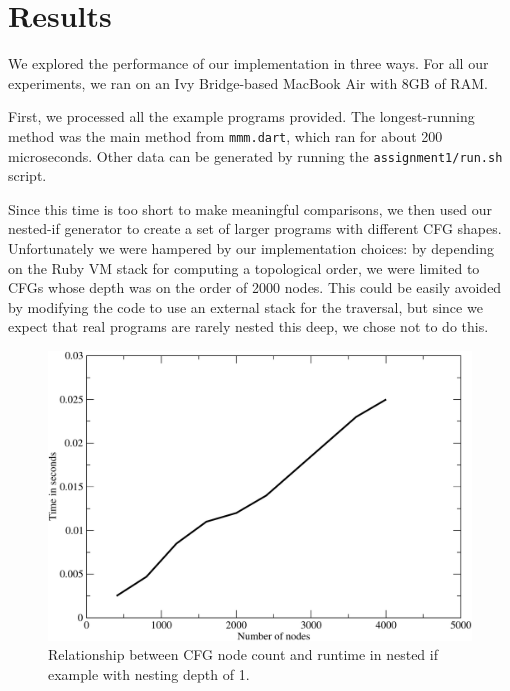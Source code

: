 \documentclass[10pt,twocolumn]{article}
\begin{document}
\section{Results}

We explored the performance of our implementation in three ways. For
all our experiments, we ran on an Ivy Bridge-based MacBook Air with
8GB of RAM.

First, we processed all the example programs provided. The
longest-running method was the main method from \texttt{mmm.dart},
which ran for about 200 microseconds. Other data can be generated by
running the \texttt{assignment1/run.sh} script.

Since this time is too short to make meaningful comparisons, we then
used our nested-if generator to create a set of larger programs with
different CFG shapes. Unfortunately we were hampered by our
implementation choices: by depending on the Ruby VM stack for
computing a topological order, we were limited to CFGs whose depth was
on the order of 2000 nodes. This could be easily avoided by modifying
the code to use an external stack for the traversal, but since we
expect that real programs are rarely nested this deep, we chose not to
do this.


\begin{figure}
\begin{center}
  \includegraphics[width=0.95\columnwidth]{figs/g1.pdf}
\begin{minipage}{0.95\columnwidth}
  \caption{\label{fig:nodes} Relationship between CFG node count and runtime in nested if example with nesting depth of 1.}
\end{minipage}
\end{center}
\end{figure}
\end{document}
